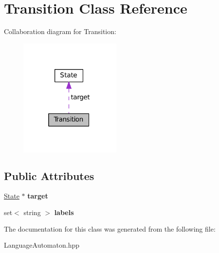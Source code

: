 \hypertarget{class_transition}{\section{Transition Class Reference}
\label{class_transition}
}


Collaboration diagram for Transition\-:\nopagebreak
\begin{figure}[H]
\begin{center}
\leavevmode
\includegraphics[width=143pt]{class_transition__coll__graph}
\end{center}
\end{figure}
\subsection*{Public Attributes}
\begin{DoxyCompactItemize}
\item 
\hypertarget{class_transition_a95996aeabce8379c8dc2760590fc76ca}{\hyperlink{class_state}{State} $\ast$ {\bfseries target}}\label{class_transition_a95996aeabce8379c8dc2760590fc76ca}

\item 
\hypertarget{class_transition_a8b347b1b9835c408c9ae6885e71c86f3}{set$<$ string $>$ {\bfseries labels}}\label{class_transition_a8b347b1b9835c408c9ae6885e71c86f3}

\end{DoxyCompactItemize}


The documentation for this class was generated from the following file\-:\begin{DoxyCompactItemize}
\item 
Language\-Automaton.\-hpp\end{DoxyCompactItemize}
